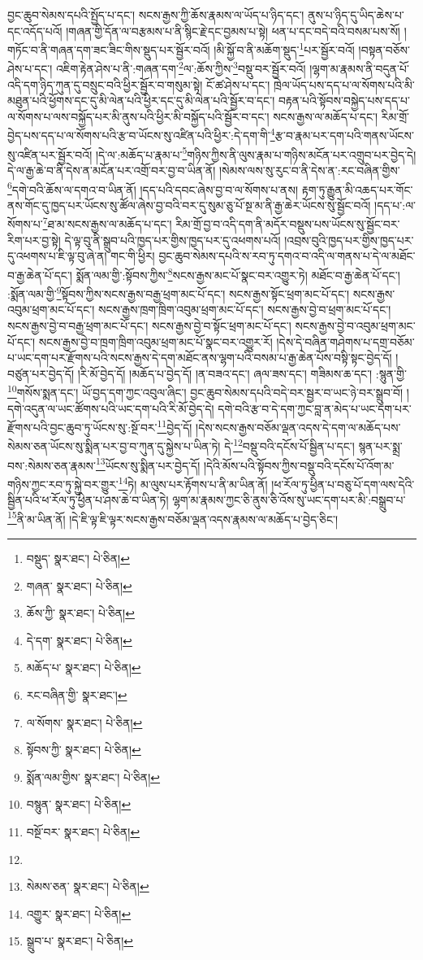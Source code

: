 བྱང་ཆུབ་སེམས་དཔའི་སྤྱོད་པ་དང་། སངས་རྒྱས་ཀྱི་ཆོས་རྣམས་ལ་ཡོད་པ་ཉིད་དང་། ནུས་པ་ཉིད་དུ་ཡིད་ཆེས་པ་དང་འདོད་པའོ། །གཞན་གྱི་དོན་ལ་བརྩམས་པ་ནི་སྙིང་རྗེ་དང་བྱམས་པ་སྟེ། ཕན་པ་དང་བདེ་བའི་བསམ་པས་སོ། །གཏོང་བ་ནི་གཞན་དག་ཟང་ཟིང་གིས་སྡུད་པར་སྦྱོར་བའོ། །མི་སྐྱོ་བ་ནི་མཆོག་སྡུད་\footnote{བསྡུད་  སྣར་ཐང་།  པེ་ཅིན། }པར་སྦྱོར་བའོ། །བསྟན་བཅོས་ཤེས་པ་དང་། འཇིག་རྟེན་ཤེས་པ་ནི་:གཞན་དག་\footnote{གཞན་  སྣར་ཐང་།  པེ་ཅིན། }ལ་:ཆོས་ཀྱིས་\footnote{ཆོས་ཀྱི་  སྣར་ཐང་།  པེ་ཅིན། }བསྡུ་བར་སྦྱོར་བའོ། །ལྷག་མ་རྣམས་ནི་བདུན་པོ་འདི་དག་ཉིད་ཀུན་དུ་བསྲུང་བའི་ཕྱིར་སྦྱོར་བ་གསུམ་སྟེ། ངོ་ཚ་ཤེས་པ་དང་། ཁྲེལ་ཡོད་པས་དད་པ་ལ་སོགས་པའི་མི་མཐུན་པའི་ཕྱོགས་དང་དུ་མི་ལེན་པའི་ཕྱིར་དང་དུ་མི་ལེན་པའི་སྦྱོར་བ་དང་། བརྟན་པའི་སྟོབས་བསྐྱེད་པས་དད་པ་ལ་སོགས་པ་ལས་བསྐྱོད་པར་མི་ནུས་པའི་ཕྱིར་མི་བསྐྱོད་པའི་སྦྱོར་བ་དང་། སངས་རྒྱས་ལ་མཆོད་པ་དང་། རིམ་གྲོ་བྱེད་པས་དད་པ་ལ་སོགས་པའི་རྩ་བ་ཡོངས་སུ་འཛིན་པའི་ཕྱིར་:དེ་དག་གི་\footnote{དེ་དག་  སྣར་ཐང་།  པེ་ཅིན། }རྩ་བ་རྣམ་པར་དག་པའི་གནས་ཡོངས་སུ་འཛིན་པར་སྦྱོར་བའོ། །དེ་ལ་:མཆོད་པ་རྣམ་པ་\footnote{མཆོད་པ་  སྣར་ཐང་།  པེ་ཅིན། }གཉིས་ཀྱིས་ནི་ལུས་རྣམ་པ་གཉིས་མངོན་པར་འགྲུབ་པར་བྱེད་དེ། དེ་ལ་རྒྱ་ཆེ་བ་ནི་དེས་ན་མངོན་པར་འགྲོ་བར་བྱ་བ་ཡིན་ནོ། །སེམས་ལས་སུ་རུང་བ་ནི་དེས་ན་:རང་བཞིན་གྱིས་\footnote{རང་བཞིན་གྱི་  སྣར་ཐང་། }དགེ་བའི་ཆོས་ལ་དགའ་བ་ཡིན་ནོ། །དད་པའི་དབང་ཞེས་བྱ་བ་ལ་སོགས་པ་ནས། རྟག་ཏུ་རྒྱུན་མི་འཆད་པར་གོང་ནས་གོང་དུ་ཁྱད་པར་ཡོངས་སུ་ཚོལ་ཞེས་བྱ་བའི་བར་དུ་སུམ་ཅུ་པོ་སྔ་མ་ནི་རྒྱ་ཆེར་ཡོངས་སུ་སྦྱོང་བའོ། །དད་པ་:ལ་སོགས་པ་\footnote{ལ་སོགས་  སྣར་ཐང་།  པེ་ཅིན། }ཐ་མ་སངས་རྒྱས་ལ་མཆོད་པ་དང་། རིམ་གྲོ་བྱ་བ་འདི་དག་ནི་མདོར་བསྡུས་པས་ཡོངས་སུ་སྦྱོང་བར་རིག་པར་བྱ་སྟེ། དེ་ལྟ་བུ་ནི་སྒྲུབ་པའི་ཁྱད་པར་གྱིས་ཁྱད་པར་དུ་འཕགས་པའོ། །འབྲས་བུའི་ཁྱད་པར་གྱིས་ཁྱད་པར་དུ་འཕགས་པ་ཇི་ལྟ་བུ་ཞེ་ན། གང་གི་ཕྱིར། བྱང་ཆུབ་སེམས་དཔའི་ས་རབ་ཏུ་དགའ་བ་འདི་ལ་གནས་པ་དེ་ལ་མཐོང་བ་རྒྱ་ཆེན་པོ་དང་། སྨོན་ལམ་གྱི་:སྟོབས་ཀྱིས་\footnote{སྟོབས་ཀྱི་  སྣར་ཐང་།  པེ་ཅིན། }སངས་རྒྱས་མང་པོ་སྣང་བར་འགྱུར་ཏེ། མཐོང་བ་རྒྱ་ཆེན་པོ་དང་། :སྨོན་ལམ་གྱི་\footnote{སྨོན་ལམ་གྱིས་  སྣར་ཐང་།  པེ་ཅིན། }སྟོབས་ཀྱིས་སངས་རྒྱས་བརྒྱ་ཕྲག་མང་པོ་དང་། སངས་རྒྱས་སྟོང་ཕྲག་མང་པོ་དང་། སངས་རྒྱས་འབུམ་ཕྲག་མང་པོ་དང་། སངས་རྒྱས་ཁྲག་ཁྲིག་འབུམ་ཕྲག་མང་པོ་དང་། སངས་རྒྱས་བྱེ་བ་ཕྲག་མང་པོ་དང་། སངས་རྒྱས་བྱེ་བ་བརྒྱ་ཕྲག་མང་པོ་དང་། སངས་རྒྱས་བྱེ་བ་སྟོང་ཕྲག་མང་པོ་དང་། སངས་རྒྱས་བྱེ་བ་འབུམ་ཕྲག་མང་པོ་དང་། སངས་རྒྱས་བྱེ་བ་ཁྲག་ཁྲིག་འབུམ་ཕྲག་མང་པོ་སྣང་བར་འགྱུར་རོ། །དེས་དེ་བཞིན་གཤེགས་པ་དགྲ་བཅོམ་པ་ཡང་དག་པར་རྫོགས་པའི་སངས་རྒྱས་དེ་དག་མཐོང་ནས་ལྷག་པའི་བསམ་པ་རྒྱ་ཆེན་པོས་བསྟི་སྟང་བྱེད་དོ། །བཙུན་པར་བྱེད་དོ། །རི་མོ་བྱེད་དོ། །མཆོད་པ་བྱེད་དོ། །ན་བཟའ་དང་། ཞལ་ཟས་དང་། གཟིམས་ཆ་དང་། :སྙུན་གྱི་\footnote{བསྙུན་  སྣར་ཐང་།  པེ་ཅིན། }གསོས་སྨན་དང་། ཡོ་བྱད་དག་ཀྱང་འབུལ་ཞིང་། བྱང་ཆུབ་སེམས་དཔའི་བདེ་བར་སྦྱར་བ་ཡང་ཉེ་བར་སྒྲུབ་བོ། །དགེ་འདུན་ལ་ཡང་ཚོགས་པའི་ཡང་དག་པའི་རི་མོ་བྱེད་དེ། དགེ་བའི་རྩ་བ་དེ་དག་ཀྱང་བླ་ན་མེད་པ་ཡང་དག་པར་རྫོགས་པའི་བྱང་ཆུབ་ཏུ་ཡོངས་སུ་:སྔོ་བར་\footnote{བསྔོ་བར་  སྣར་ཐང་།  པེ་ཅིན། }བྱེད་དོ། །དེས་སངས་རྒྱས་བཅོམ་ལྡན་འདས་དེ་དག་ལ་མཆོད་པས་སེམས་ཅན་ཡོངས་སུ་སྨིན་པར་བྱ་བ་ཀུན་དུ་སྐྱེས་པ་ཡིན་ཏེ། དེ་\footnote{}བསྡུ་བའི་དངོས་པོ་སྦྱིན་པ་དང་། སྙན་པར་སྨྲ་བས་:སེམས་ཅན་རྣམས་\footnote{སེམས་ཅན་  སྣར་ཐང་།  པེ་ཅིན། }ཡོངས་སུ་སྨིན་པར་བྱེད་དོ། །དེའི་མོས་པའི་སྟོབས་ཀྱིས་བསྡུ་བའི་དངོས་པོ་འོག་མ་གཉིས་ཀྱང་རབ་ཏུ་སྐྱེ་བར་གྱུར་\footnote{འགྱུར་  སྣར་ཐང་།  པེ་ཅིན། }ཏེ། མ་ལུས་པར་རྟོགས་པ་ནི་མ་ཡིན་ནོ། །ཕ་རོལ་ཏུ་ཕྱིན་པ་བཅུ་པོ་དག་ལས་དེའི་སྦྱིན་པའི་ཕ་རོལ་ཏུ་ཕྱིན་པ་ཤས་ཆེ་བ་ཡིན་ཏེ། ལྷག་མ་རྣམས་ཀྱང་ཅི་ནུས་ཅི་འོས་སུ་ཡང་དག་པར་མི་:བསྒྲུབ་པ་\footnote{སྒྲུབ་པ་  སྣར་ཐང་།  པེ་ཅིན། }ནི་མ་ཡིན་ནོ། །དེ་ཇི་ལྟ་ཇི་ལྟར་སངས་རྒྱས་བཅོམ་ལྡན་འདས་རྣམས་ལ་མཆོད་པ་བྱེད་ཅིང་། 